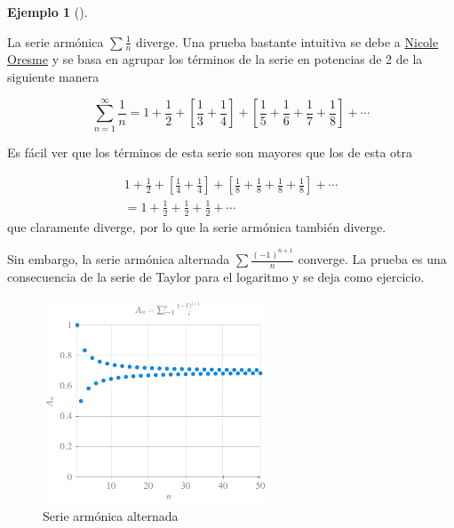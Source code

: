 \documentclass[
  a4paper,
]{scrreport}
\theoremstyle{definition}
\newtheorem{example}{Ejemplo}[chapter]
\theoremstyle{plain}
\theoremstyle{definition}
\theoremstyle{definition}
\theoremstyle{plain}
\theoremstyle{plain}
\theoremstyle{remark}
\begin{document}
\begin{example}[]\protect\hypertarget{exm-divergencia-serie-armonica}{}\label{exm-divergencia-serie-armonica}

La serie armónica \(\sum \frac{1}{n}\) diverge. Una prueba bastante
intuitiva se debe a
\href{https://es.wikipedia.org/wiki/Nicol\%C3\%A1s_Oresme}{Nicole
Oresme} y se basa en agrupar los términos de la serie en potencias de 2
de la siguiente manera

\[
\sum_{n=1}^\infty \frac{1}{n} = 1 + \frac{1}{2} + \left[\frac{1}{3}+\frac{1}{4}\right] + \left[\frac{1}{5}+\frac{1}{6}+\frac{1}{7}+\frac{1}{8}\right] + \cdots
\]

Es fácil ver que los términos de esta serie son mayores que los de esta
otra

\[
\begin{gathered}
1 + \frac{1}{2} + \left[\frac{1}{4}+\frac{1}{4}\right] + \left[\frac{1}{8}+\frac{1}{8}+\frac{1}{8}+\frac{1}{8}\right] + \cdots \\ 
= 1 +\frac{1}{2} + \frac{1}{2} + \frac{1}{2} + \cdots
\end{gathered}
\] que claramente diverge, por lo que la serie armónica también diverge.

Sin embargo, la serie armónica alternada \(\sum \frac{(-1)^{n+1}}{n}\)
converge. La prueba es una consecuencia de la serie de Taylor para el
logaritmo y se deja como ejercicio.

\begin{figure}[H]

{\centering \includegraphics[width=0.6\textwidth,height=\textheight]{img/series/serie-armonica-alternada.pdf}

}

\caption{Serie armónica alternada}

\end{figure}%

\end{example}
\end{document}
